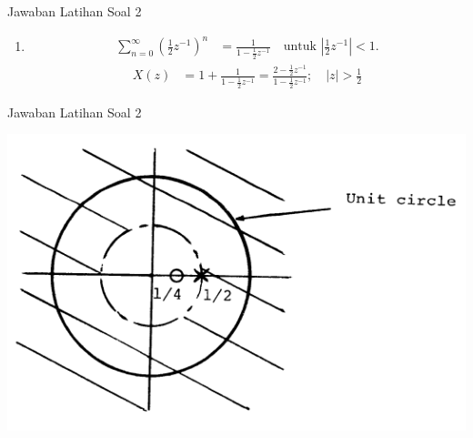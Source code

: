 \documentclass[pdflatex,compress,mathserif]{beamer}
\begin{document}
\begin{frame}{Jawaban Latihan Soal 2}
	\begin{enumerate}
		\item[]
		\begin{align*}
		\sum_{n=0}^{\infty} \left(\frac{1}{2}z^{-1}\right)^n &= \frac{1}{1 - \frac{1}{2}z^{-1}} \quad \text{untuk } \left|\frac{1}{2}z^{-1}\right| < 1.
		\end{align*}
		\begin{align*}
		X(z) &= 1 + \frac{1}{1 - \frac{1}{2}z^{-1}} = \frac{2 - \frac{1}{2}z^{-1}}{1 - \frac{1}{2}z^{-1}};\quad |z| > \frac{1}{2}
		\end{align*}
	\end{enumerate}
\end{frame}

\begin{frame}{Jawaban Latihan Soal 2}
	\begin{center}
		\includegraphics[width=0.7\linewidth]{img/img06}
	\end{center}
\end{frame}
\end{document}
